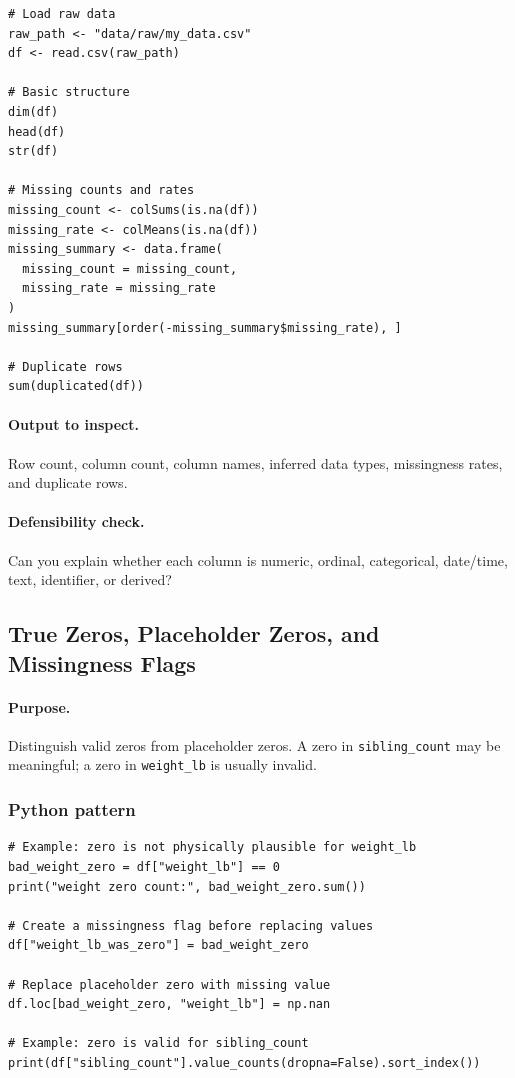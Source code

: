\begin{verbatim}
# Load raw data
raw_path <- "data/raw/my_data.csv"
df <- read.csv(raw_path)

# Basic structure
dim(df)
head(df)
str(df)

# Missing counts and rates
missing_count <- colSums(is.na(df))
missing_rate <- colMeans(is.na(df))
missing_summary <- data.frame(
  missing_count = missing_count,
  missing_rate = missing_rate
)
missing_summary[order(-missing_summary$missing_rate), ]

# Duplicate rows
sum(duplicated(df))
\end{verbatim}

\paragraph{Output to inspect.} Row count, column count, column names, inferred data types, missingness rates, and duplicate rows.

\paragraph{Defensibility check.} Can you explain whether each column is numeric, ordinal, categorical, date/time, text, identifier, or derived?

\subsection{True Zeros, Placeholder Zeros, and Missingness Flags}
\label{app:ch03-software-cookbook-zeros-and-flags}

\paragraph{Purpose.} Distinguish valid zeros from placeholder zeros.  A zero in \texttt{sibling\_count} may be meaningful; a zero in \texttt{weight\_lb} is usually invalid.

\subsubsection*{Python pattern}

\begin{verbatim}
# Example: zero is not physically plausible for weight_lb
bad_weight_zero = df["weight_lb"] == 0
print("weight zero count:", bad_weight_zero.sum())

# Create a missingness flag before replacing values
df["weight_lb_was_zero"] = bad_weight_zero

# Replace placeholder zero with missing value
df.loc[bad_weight_zero, "weight_lb"] = np.nan

# Example: zero is valid for sibling_count
print(df["sibling_count"].value_counts(dropna=False).sort_index())
\end{verbatim}

